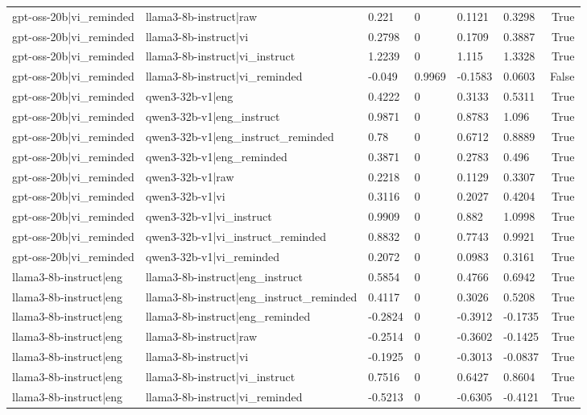 \begin{table}
\begin{tabular}{llllllr}
gpt-oss-20b|vi_reminded & llama3-8b-instruct|raw & 0.221 & 0 & 0.1121 & 0.3298 & True \\
gpt-oss-20b|vi_reminded & llama3-8b-instruct|vi & 0.2798 & 0 & 0.1709 & 0.3887 & True \\
gpt-oss-20b|vi_reminded & llama3-8b-instruct|vi_instruct & 1.2239 & 0 & 1.115 & 1.3328 & True \\
gpt-oss-20b|vi_reminded & llama3-8b-instruct|vi_reminded & -0.049 & 0.9969 & -0.1583 & 0.0603 & False \\
gpt-oss-20b|vi_reminded & qwen3-32b-v1|eng & 0.4222 & 0 & 0.3133 & 0.5311 & True \\
gpt-oss-20b|vi_reminded & qwen3-32b-v1|eng_instruct & 0.9871 & 0 & 0.8783 & 1.096 & True \\
gpt-oss-20b|vi_reminded & qwen3-32b-v1|eng_instruct_reminded & 0.78 & 0 & 0.6712 & 0.8889 & True \\
gpt-oss-20b|vi_reminded & qwen3-32b-v1|eng_reminded & 0.3871 & 0 & 0.2783 & 0.496 & True \\
gpt-oss-20b|vi_reminded & qwen3-32b-v1|raw & 0.2218 & 0 & 0.1129 & 0.3307 & True \\
gpt-oss-20b|vi_reminded & qwen3-32b-v1|vi & 0.3116 & 0 & 0.2027 & 0.4204 & True \\
gpt-oss-20b|vi_reminded & qwen3-32b-v1|vi_instruct & 0.9909 & 0 & 0.882 & 1.0998 & True \\
gpt-oss-20b|vi_reminded & qwen3-32b-v1|vi_instruct_reminded & 0.8832 & 0 & 0.7743 & 0.9921 & True \\
gpt-oss-20b|vi_reminded & qwen3-32b-v1|vi_reminded & 0.2072 & 0 & 0.0983 & 0.3161 & True \\
llama3-8b-instruct|eng & llama3-8b-instruct|eng_instruct & 0.5854 & 0 & 0.4766 & 0.6942 & True \\
llama3-8b-instruct|eng & llama3-8b-instruct|eng_instruct_reminded & 0.4117 & 0 & 0.3026 & 0.5208 & True \\
llama3-8b-instruct|eng & llama3-8b-instruct|eng_reminded & -0.2824 & 0 & -0.3912 & -0.1735 & True \\
llama3-8b-instruct|eng & llama3-8b-instruct|raw & -0.2514 & 0 & -0.3602 & -0.1425 & True \\
llama3-8b-instruct|eng & llama3-8b-instruct|vi & -0.1925 & 0 & -0.3013 & -0.0837 & True \\
llama3-8b-instruct|eng & llama3-8b-instruct|vi_instruct & 0.7516 & 0 & 0.6427 & 0.8604 & True \\
llama3-8b-instruct|eng & llama3-8b-instruct|vi_reminded & -0.5213 & 0 & -0.6305 & -0.4121 & True \\

\end{tabular}
\end{table}

